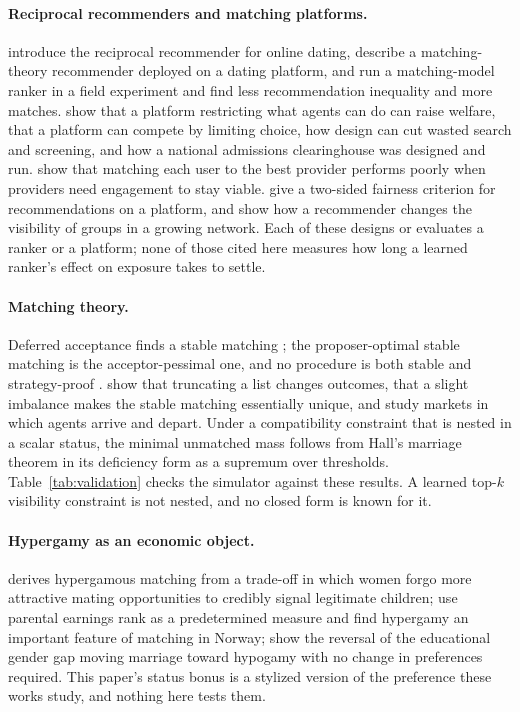 \paragraph{Reciprocal recommenders and matching platforms.} \citet{pizzato2010}
introduce the reciprocal recommender for online dating, \citet{tomita2022}
describe a matching-theory recommender deployed on a dating platform, and
\citet{chen2023} run a matching-model ranker in a field experiment and find less
recommendation inequality and more matches. \citet{kanoria2021} show that a
platform restricting what agents can do can raise welfare, \citet{halaburda2018}
that a platform can compete by limiting choice, \citet{arnosti2021} how design can
cut wasted search and screening, and \citet{rios2021} how a national admissions
clearinghouse was designed and run. \citet{mladenov2020} show that matching each
user to the best provider performs poorly when providers need engagement to stay
viable. \citet{patro2020} give a two-sided fairness criterion for recommendations on a
platform, and \citet{stoica2018} show how a recommender changes the visibility of
groups in a growing network. Each of these designs or evaluates a ranker or a
platform; none of those cited here measures how long a learned ranker's effect on
exposure takes to settle.

\paragraph{Matching theory.} Deferred acceptance finds a stable matching
\citep{gale1962}; the proposer-optimal stable matching is the acceptor-pessimal
one, and no procedure is both stable and strategy-proof \citep{roth1982,knuth1996}.
\citet{roth1999} show that truncating a list changes outcomes,
\citet{ashlagi2017} that a slight imbalance makes the stable matching essentially
unique, and \citet{akbarpour2020} study markets in which agents arrive and depart.
Under a compatibility constraint that is nested in a scalar status, the minimal
unmatched mass follows from Hall's marriage theorem \citep{hall1935} in its
deficiency form as a supremum over thresholds. Table~\ref{tab:validation} checks
the simulator against these results. A learned top-$k$ visibility constraint is
not nested, and no closed form is known for it.

\paragraph{Hypergamy as an economic object.} \citet{saintpaul2015} derives
hypergamous matching from a trade-off in which women forgo more attractive mating
opportunities to credibly signal legitimate children; \citet{almas2023} use
parental earnings rank as a predetermined measure and find hypergamy an important
feature of matching in Norway; \citet{esteve2016} show the reversal of the
educational gender gap moving marriage toward hypogamy with no change in
preferences required. This paper's status bonus is a stylized version of the
preference these works study, and nothing here tests them.

